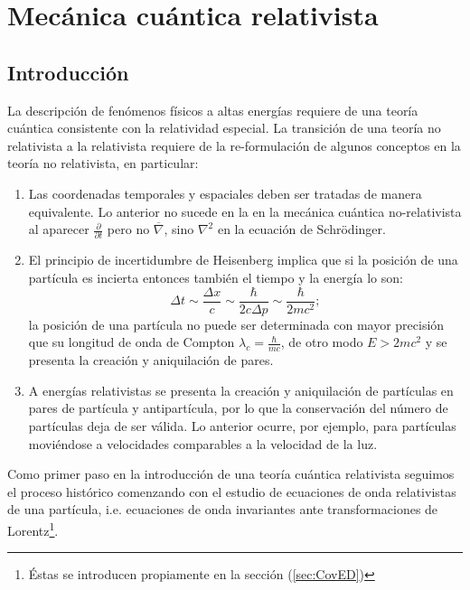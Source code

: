 \chapter{Mecánica cuántica relativista}
\label{chap:MCR}

\section{Introducción}
\label{sec:IntroMCR}

La descripción de fenómenos físicos a altas energías requiere de una teoría cuántica consistente con la relatividad especial. La transición de una teoría no relativista a la relativista requiere de la re-formulación de algunos conceptos en la teoría no relativista, en particular:
\begin{enumerate}
	\item Las coordenadas temporales y espaciales deben ser tratadas de manera equivalente. Lo anterior no sucede en la en la mecánica cuántica no-relativista al aparecer $\frac{\partial}{\partial t}$ pero no $\overline{\nabla}$, sino $\nabla^2$ en la ecuación de Schrödinger.
	\item El principio de incertidumbre de Heisenberg implica que si la posición de una partícula es incierta entonces también el tiempo y la energía lo son:
	$$\Delta t\sim \frac{\Delta x}{c}\sim \frac{\hbar}{2c\Delta p }\sim \frac{\hbar}{2mc^2};$$ la posición de una partícula no puede ser determinada 
	con mayor precisión que su longitud de onda de Compton $\lambda_c=\frac{\hbar}{mc}$, de otro modo $E>2mc^2$ y se presenta la creación y aniquilación de pares.

	\item A energías relativistas se presenta la creación y aniquilación de partículas en pares de partícula y antipartícula, por lo que la conservación del número de partículas deja de ser válida. Lo anterior ocurre, por ejemplo, para partículas moviéndose a velocidades comparables a la velocidad de la luz.
\end{enumerate}

Como primer paso en la introducción de una teoría cuántica relativista seguimos el proceso histórico comenzando con el estudio de ecuaciones de onda relativistas de una partícula, i.e. ecuaciones de onda invariantes ante transformaciones de Lorentz\footnote{Éstas se introducen propiamente en la sección (\ref{sec:CovED})}.
